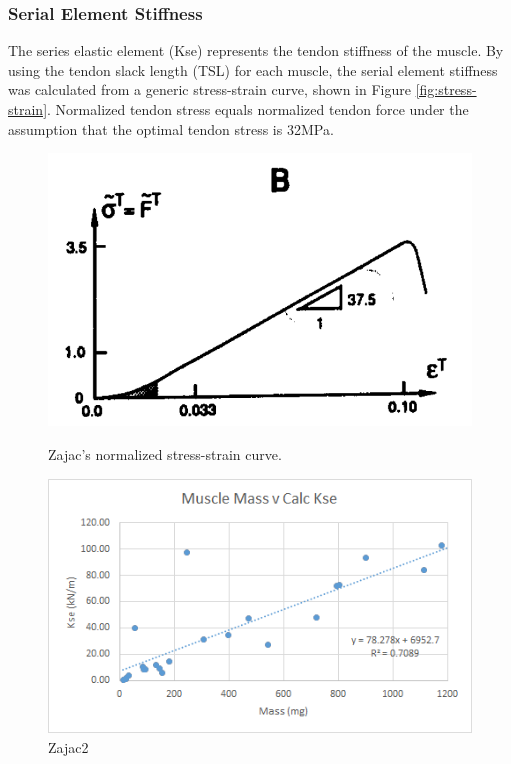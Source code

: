 \documentclass[runningheads,a4paper]{llncs}
\begin{document}
	\subsubsection{Serial Element Stiffness}
		The series elastic element (Kse) represents the tendon stiffness of the muscle. By using the tendon slack length (TSL) for each muscle\cite{johnson_application_2011}, the serial element stiffness was calculated from a generic stress-strain curve\cite{zajac_muscle_1989}, shown in Figure \ref{fig:stress-strain}. Normalized tendon stress equals normalized tendon force under the assumption that the optimal tendon stress is 32MPa.
			
			\begin{figure}[!htbp]
			    \begin{minipage}{0.5\textwidth}
			        \centering
			        \includegraphics[width=\textwidth]{Figures/zajac1.PNG}
			        \caption{Zajac's normalized stress-strain curve.}
			        \label{fig:stress-strain}
			    \end{minipage}\hfill
			    \begin{minipage}{0.5\textwidth}
			        \centering
			        \includegraphics[width=\textwidth]{Figures/zajac3.png}
			        \caption{Zajac2}
			        \label{fig:img2}
			    \end{minipage}
			\end{figure}
			
\end{document}
